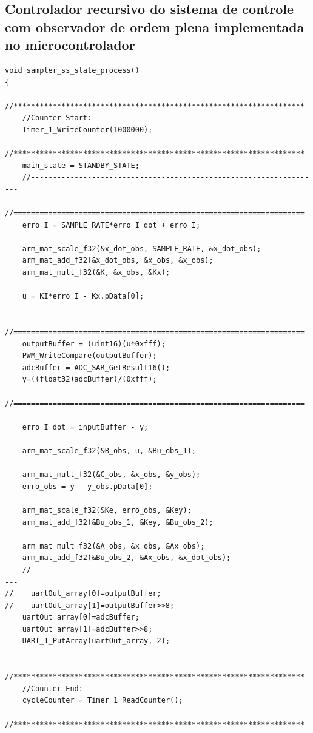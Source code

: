 \documentclass[
	article,			%
	11pt,				%
	oneside,			%
	a4paper,			%
	english,			%
	brazil,				%
	sumario=tradicional
	]{abntex2}
\begin{document}
\begin{apendicesenv}
\chapter{Controlador recursivo do sistema de controle com observador de ordem plena implementada no microcontrolador}
	\label{app:implementacaoRecursivaCMSIS}
	
	\lstset{language=C}
	\begin{lstlisting}
void sampler_ss_state_process()
{
    //*******************************************************************
    //Counter Start:
    Timer_1_WriteCounter(1000000);
    //*******************************************************************
    main_state = STANDBY_STATE;      
    //-------------------------------------------------------------------
    //===================================================================    
    erro_I = SAMPLE_RATE*erro_I_dot + erro_I;
    
    arm_mat_scale_f32(&x_dot_obs, SAMPLE_RATE, &x_dot_obs);
    arm_mat_add_f32(&x_dot_obs, &x_obs, &x_obs);
    arm_mat_mult_f32(&K, &x_obs, &Kx);
       
    u = KI*erro_I - Kx.pData[0];     
    
    //===================================================================  
    outputBuffer = (uint16)(u*0xfff);   
    PWM_WriteCompare(outputBuffer);        
    adcBuffer = ADC_SAR_GetResult16(); 
    y=((float32)adcBuffer)/(0xfff);   
    //===================================================================  
    
    erro_I_dot = inputBuffer - y;
    
    arm_mat_scale_f32(&B_obs, u, &Bu_obs_1);
    
    arm_mat_mult_f32(&C_obs, &x_obs, &y_obs);
    erro_obs = y - y_obs.pData[0];
    
    arm_mat_scale_f32(&Ke, erro_obs, &Key);
    arm_mat_add_f32(&Bu_obs_1, &Key, &Bu_obs_2);
    
    arm_mat_mult_f32(&A_obs, &x_obs, &Ax_obs);
    arm_mat_add_f32(&Bu_obs_2, &Ax_obs, &x_dot_obs);    
    //-------------------------------------------------------------------
//    uartOut_array[0]=outputBuffer;
//    uartOut_array[1]=outputBuffer>>8;
    uartOut_array[0]=adcBuffer;
    uartOut_array[1]=adcBuffer>>8;
    UART_1_PutArray(uartOut_array, 2); 
  
    //*******************************************************************
    //Counter End:
    cycleCounter = Timer_1_ReadCounter(); 
    //******************************************************************* 
    

\end{lstlisting}
\end{apendicesenv}
\end{document}
